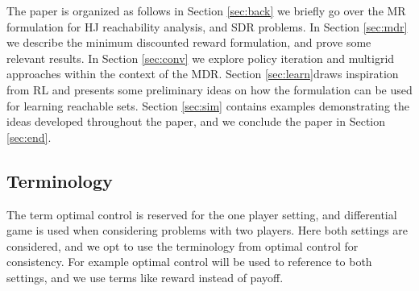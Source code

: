 The paper is organized as follows in Section \ref{sec:back} we briefly go over the MR formulation for HJ reachability analysis, and SDR problems. In Section \ref{sec:mdr} we describe the minimum discounted  reward formulation, and prove some relevant results. In Section \ref{sec:conv} we explore policy iteration and multigrid approaches within the context of the MDR. Section \ref{sec:learn}draws inspiration from RL and presents some preliminary ideas on how the formulation can be used for learning reachable sets. Section \ref{sec:sim} contains examples demonstrating the ideas developed throughout the paper, and we conclude the paper in Section \ref{sec:end}.

\subsection*{Terminology}

The term optimal control is reserved for the one player setting, and differential game is used when considering problems with two players. Here both settings are considered, and we opt to use the terminology from optimal control for consistency. For example optimal control will be used to reference to both settings, and we use terms like reward instead of payoff.




